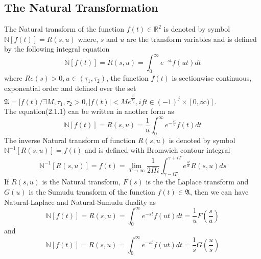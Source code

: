 \subsection{The Natural Transformation}
The Natural transform of the function $f(t)\in\mathbb{R}^{2}$ is denoted by symbol $\mathbb{N}[f(t)]=R(s,u)$ where, $s$ and $u$ are the transform variables and is defined by the following integral equation\cite{R13}
\begin{equation}
\mathbb{N}[f(t)] = R(s,u) = \int_{0}^{\infty}e^{-st}f(ut)dt 
 \end{equation} 
 where $Re(s)>0, u\in(\tau_{1}, \tau_{2})$, the function $f(t)$ is sectionwise continuous, exponential order and defined over the set\\
 $\mathfrak{A}=[f(t)/\exists M,\tau_{1}, \tau_{2} > 0,|f(t)| < M e^{\frac{|t|}{\tau_{j}}},if t\in(-1)^{j}\times[0,\infty) ].$\\
The equation(2.1.1) can be written in another form as
 \begin{equation}
\mathbb{N}[f(t)] = R(s,u) = \frac{1}{u}\int_{0}^{\infty}e^{-\frac{st}{u}}f(t)dt 
 \end{equation}
The inverse Natural transform of function $ R(s,u)$ is denoted by symbol $\mathbb{N}^{-1}[R(s,u)]= f(t)$ and is defined with Bromwich contour integral\cite{R12,R13}
 \begin{equation}
 \mathbb{N}^{-1}[R(s,u)] = f(t) = \lim _{T\rightarrow\infty} \frac{1}{2\Pi i}\int_{\gamma-iT}^{\gamma+iT}e^{\frac{st}{u}}R(s, u)ds
 \end{equation}
If $R(s,u)$ is the Natural transform, $F(s)$ is the the Laplace transform and $G(u)$ is the Sumudu transform of the function $ f(t) \in \mathfrak{A} $, then we  can have Natural-Laplace and Natural-Sumudu duality as
 \begin{equation}
\mathbb{N}[f(t)] = R(s,u) = \int_{0}^{\infty}e^{-st}f(ut)dt =\frac{1}{u}F(\frac{s}{u})
 \end{equation}
 and
  \begin{equation}
\mathbb{N}[f(t)] = R(s,u) = \int_{0}^{\infty}e^{-st}f(ut)dt =\frac{1}{s}G(\frac{u}{s})
 \end{equation}  

